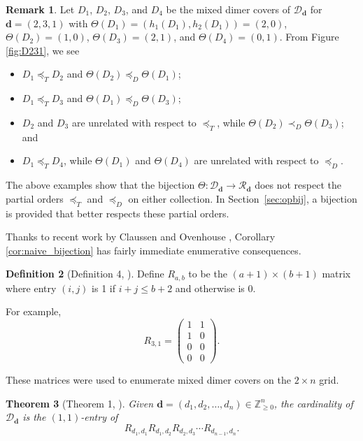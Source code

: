 \documentclass{amsart}
\newtheorem{theorem}{Theorem}[section]
\theoremstyle{definition}
\newtheorem{definition}[theorem]{Definition}
\newtheorem{remark}[theorem]{Remark}
\begin{document}
\begin{remark}\label{rem:naive}
    Let $D_1$, $D_2$, $D_3$, and $D_4$ be the mixed dimer covers of $\mathcal{D}_{\mathbf{d}}$ for $\mathbf{d}=(2,3,1)$ with $\Theta(D_1)=(h_1(D_1),h_2(D_1))=(2,0)$, $\Theta(D_2)=(1,0)$, $\Theta(D_3)=(2,1)$, and $\Theta(D_4)=(0,1)$. From Figure \ref{fig:D231}, we see 
    \begin{itemize}
        \item $D_1\preceq_T D_2$ and $\Theta(D_2)\preceq_D\Theta(D_1)$;
        \item $D_1\preceq_T D_3$ and $\Theta(D_1)\preceq_D\Theta(D_3)$;
        \item $D_2$ and $D_3$ are unrelated with respect to $\preceq_T$, while $\Theta(D_2)\prec_D\Theta(D_3)$; and
        \item $D_1\preceq_T D_4$, while $\Theta(D_1)$ and $\Theta(D_4)$ are unrelated with respect to $\preceq_D$.
    \end{itemize}
    The above examples show that the bijection $\Theta:\mathcal{D}_\mathbf{d}\to\mathcal{R}_\mathbf{d}$ does not respect the partial orders $\preceq_T$ and $\preceq_D$ on either collection. In Section~\ref{sec:opbij}, a bijection is provided that better respects these partial orders.
\end{remark}

Thanks to recent work by Claussen and Ovenhouse \cite{ClaussenOvenhouse}, Corollary \ref{cor:naive_bijection} has fairly immediate enumerative consequences. 

\begin{definition}[Definition 4, \cite{ClaussenOvenhouse}]
    Define $R_{a,b}$ to be the $(a+1) \times (b+1)$ matrix where entry $(i,j)$ is 1 if $i+j \leq b+2$ and otherwise is 0.
\end{definition}
For example, 
    \[
R_{3,1}=\begin{pmatrix} 1 & 1 \\ 1 & 0 \\ 0 & 0 \\ 0 & 0 \end{pmatrix}.
 \]

 These matrices were used to enumerate mixed dimer covers on the $2 \times n$ grid.

 \begin{theorem}[Theorem 1, \cite{ClaussenOvenhouse}]\label{thm:ClaussenOvenhouse}
  Given $\mathbf{d} = (d_1,d_2,\ldots,d_n) \in \mathbb{Z}_{\ge 0}^n$, the cardinality of $\mathcal{D}_{\mathbf{d}}$  is the $(1,1)$-entry of \[
R_{d_1,d_1}R_{d_1,d_2} R_{d_2,d_3} \cdots R_{d_{n-1},d_n}.
    \]  
 \end{theorem}
\end{document}
